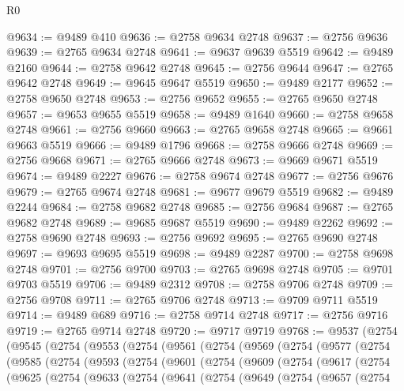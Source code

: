\begin{lexlean}{R0}
\begin{coremodule}
@9634 := @9489 @410
@9636 := @2758 @9634 @2748
@9637 := @2756 @9636
@9639 := @2765 @9634 @2748
@9641 := @9637 @9639 @5519
@9642 := @9489 @2160
@9644 := @2758 @9642 @2748
@9645 := @2756 @9644
@9647 := @2765 @9642 @2748
@9649 := @9645 @9647 @5519
@9650 := @9489 @2177
@9652 := @2758 @9650 @2748
@9653 := @2756 @9652
@9655 := @2765 @9650 @2748
@9657 := @9653 @9655 @5519
@9658 := @9489 @1640
@9660 := @2758 @9658 @2748
@9661 := @2756 @9660
@9663 := @2765 @9658 @2748
@9665 := @9661 @9663 @5519
@9666 := @9489 @1796
@9668 := @2758 @9666 @2748
@9669 := @2756 @9668
@9671 := @2765 @9666 @2748
@9673 := @9669 @9671 @5519
@9674 := @9489 @2227
@9676 := @2758 @9674 @2748
@9677 := @2756 @9676
@9679 := @2765 @9674 @2748
@9681 := @9677 @9679 @5519
@9682 := @9489 @2244
@9684 := @2758 @9682 @2748
@9685 := @2756 @9684
@9687 := @2765 @9682 @2748
@9689 := @9685 @9687 @5519
@9690 := @9489 @2262
@9692 := @2758 @9690 @2748
@9693 := @2756 @9692
@9695 := @2765 @9690 @2748
@9697 := @9693 @9695 @5519
@9698 := @9489 @2287
@9700 := @2758 @9698 @2748
@9701 := @2756 @9700
@9703 := @2765 @9698 @2748
@9705 := @9701 @9703 @5519
@9706 := @9489 @2312
@9708 := @2758 @9706 @2748
@9709 := @2756 @9708
@9711 := @2765 @9706 @2748
@9713 := @9709 @9711 @5519
@9714 := @9489 @689
@9716 := @2758 @9714 @2748
@9717 := @2756 @9716
@9719 := @2765 @9714 @2748
@9720 := @9717 @9719
@9768 := @9537
    (@2754
      (@9545
        (@2754
          (@9553
            (@2754
              (@9561
                (@2754
                  (@9569
                    (@2754
                      (@9577
                        (@2754
                          (@9585
                            (@2754
                              (@9593
                                (@2754
                                  (@9601
                                    (@2754
                                      (@9609
                                        (@2754
                                          (@9617
                                            (@2754
                                              (@9625
                                                (@2754
                                                  (@9633
                                                    (@2754
                                                      (@9641
                                                        (@2754
                                                          (@9649
                                                            (@2754
                                                              (@9657
                                                                (@2754

\end{coremodule}
\end{lexlean}
